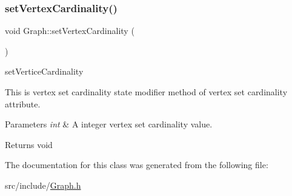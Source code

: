 \subsubsection{\texorpdfstring{set\+Vertex\+Cardinality()}{setVertexCardinality()}}
{\footnotesize\ttfamily void Graph\+::set\+Vertex\+Cardinality (\begin{DoxyParamCaption}\item[{int}]{ }\end{DoxyParamCaption})}



setV\textquotesingle{}ertice\+Cardinality 

This is vertex set cardinality state modifier method of vertex set cardinality attribute.


\begin{DoxyParams}{Parameters}
{\em int} & A integer vertex set cardinality value. \\
\hline
\end{DoxyParams}
\begin{DoxyReturn}{Returns}
void 
\end{DoxyReturn}


The documentation for this class was generated from the following file\+:\begin{DoxyCompactItemize}
\item 
src/include/\hyperlink{Graph_8h}{Graph.\+h}\end{DoxyCompactItemize}
